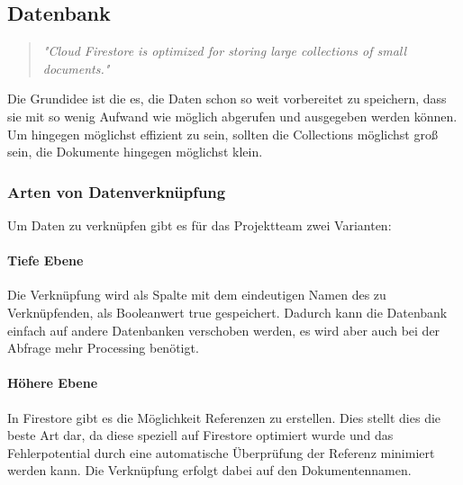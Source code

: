 \subsection{Datenbank}

\begin{quote}
  \textit{
    "Cloud Firestore is optimized for storing large collections of small documents."}
\end{quote}

Die Grundidee ist die es, die Daten schon so weit vorbereitet zu speichern, dass sie mit so wenig Aufwand wie möglich abgerufen und ausgegeben werden können. Um hingegen möglichst effizient zu sein, sollten die Collections möglichst groß sein, die Dokumente hingegen möglichst klein.

\subsubsection{Arten von Datenverknüpfung}

Um Daten zu verknüpfen gibt es für das Projektteam zwei Varianten:

\paragraph{Tiefe Ebene}
Die Verknüpfung wird als Spalte mit dem eindeutigen Namen des zu Verknüpfenden, als Booleanwert true gespeichert.  Dadurch kann die Datenbank einfach auf andere Datenbanken verschoben werden, es wird aber auch bei der Abfrage mehr Processing benötigt.

\paragraph{Höhere Ebene}
In Firestore gibt es die Möglichkeit Referenzen zu erstellen. Dies stellt dies die beste Art dar, da diese speziell auf Firestore optimiert wurde und das Fehlerpotential durch eine automatische Überprüfung der Referenz minimiert werden kann. Die Verknüpfung erfolgt dabei auf den Dokumentennamen.
